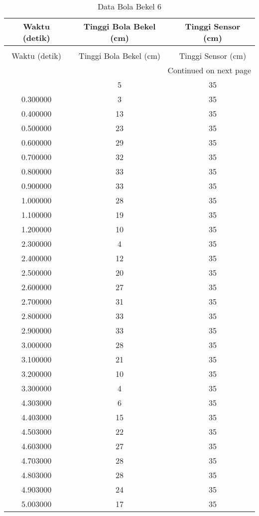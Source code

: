 \begin{longtable}[htbp]{|c|c|c|}
\caption{Data Bola Bekel 6} \\
\hline
Waktu (detik) & Tinggi Bola Bekel (cm) & Tinggi Sensor (cm) \\ \hline
\endfirsthead
\caption[]{Data Bola Bekel 6} \\
\hline
Waktu (detik) & Tinggi Bola Bekel (cm) & Tinggi Sensor (cm) \\ \hline
\endhead
\multicolumn{3}{r}{Continued on next page} \\
\endfoot
\endlastfoot
0.793083 & 5 & 35 \\ \hline
0.300000 & 3 & 35 \\ \hline
0.400000 & 13 & 35 \\ \hline
0.500000 & 23 & 35 \\ \hline
0.600000 & 29 & 35 \\ \hline
0.700000 & 32 & 35 \\ \hline
0.800000 & 33 & 35 \\ \hline
0.900000 & 33 & 35 \\ \hline
1.000000 & 28 & 35 \\ \hline
1.100000 & 19 & 35 \\ \hline
1.200000 & 10 & 35 \\ \hline
2.300000 & 4 & 35 \\ \hline
2.400000 & 12 & 35 \\ \hline
2.500000 & 20 & 35 \\ \hline
2.600000 & 27 & 35 \\ \hline
2.700000 & 31 & 35 \\ \hline
2.800000 & 33 & 35 \\ \hline
2.900000 & 33 & 35 \\ \hline
3.000000 & 28 & 35 \\ \hline
3.100000 & 21 & 35 \\ \hline
3.200000 & 10 & 35 \\ \hline
3.300000 & 4 & 35 \\ \hline
4.303000 & 6 & 35 \\ \hline
4.403000 & 15 & 35 \\ \hline
4.503000 & 22 & 35 \\ \hline
4.603000 & 27 & 35 \\ \hline
4.703000 & 28 & 35 \\ \hline
4.803000 & 28 & 35 \\ \hline
4.903000 & 24 & 35 \\ \hline
5.003000 & 17 & 35 \\ \hline

\end{longtable}
